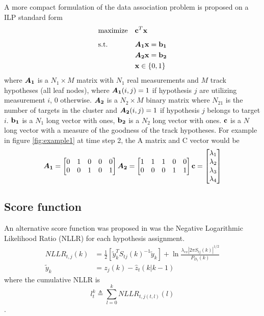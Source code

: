 A more compact formulation of the data association problem is proposed on a ILP standard form
\begin{equation}
\begin{aligned}
&	\underset{}{\text{maximize}}
&&	\boldsymbol{\mathbf{c}}^T \boldsymbol{\mathbf{x}} \\
&	\text{s.t.}
&&	\bm{A_1} \boldsymbol{\mathbf{x}} = \boldsymbol{\mathbf{b_1}} 	\\
&&&	\bm{A_2} \boldsymbol{\mathbf{x}} = \boldsymbol{\mathbf{b_2}}	\\
&&&	\boldsymbol{\mathbf{x}} \in \{0,1\}
\end{aligned}
\end{equation}
where $\bm{A_1}$ is a $N_1 \times M$ matrix with $N_1$ real measurements and $M$ track hypotheses (all leaf nodes), where $\bm{A_1}(i,j)=1$ if hypothesis $j$ are utilizing measurement $i$, $0$ otherwise. $\bm{A_2}$ is a $N_2 \times M$ binary matrix where $N_21$ is the number of targets in the cluster and $\bm{A_2}(i,j)=1$ if hypothesis $j$ belongs to target $i$. $\boldsymbol{\mathbf{b_1}}$ is a $N_1$ long vector with ones, $\boldsymbol{\mathbf{b_2}}$ is a $N_2$ long vector with ones. $\boldsymbol{\mathbf{c}}$ is a $N$ long vector with a measure of the goodness of the track hypotheses. For example in figure \ref{fig:example1} at time step 2, the A matrix  and C vector would be
\begin{equation}
\bm{A_1} =\begin{bmatrix}
		0 & 1 & 0 & 0 & 0\\
       	0 & 0 & 1 & 0 & 1
     	\end{bmatrix}
\bm{A_2} =\begin{bmatrix}
		1 & 1 & 1 & 0 & 0\\
       	0 & 0 & 0 & 1 & 1
     	\end{bmatrix}
\boldsymbol{\mathbf{c}} =\begin{bmatrix}
		\lambda_1 \\ \lambda_2 \\ \lambda_3 \\ \lambda_4
		\end{bmatrix}
\end{equation}

\subsection{Score function}
An alternative score function was proposed in \cite{Bar-Shalom2007} was the Negative Logarithmic Likelihood Ratio (NLLR) for each hypothesis assignment.
\begin{equation}
\begin{split}
NLLR_{t,j}(k) &= \frac{1}{2} \left[ \tilde{y}_k^T S_{tj}(k)^{-1} \tilde{y}_k \right] + \ln \frac{\lambda_{ex} |2 \pi S_{tj}(k)|^{1/2}}{P_{D_t}(k)} \\				
\tilde{y}_k &= z_j(k)-\hat{z}_t(k|k-1)
\end{split}
\end{equation}
where the cumulative NLLR is
\begin{equation}
l_t^k \triangleq \sum_{l=0}^k NLLR_{t,j(t,l)}(l)
\end{equation}
.




